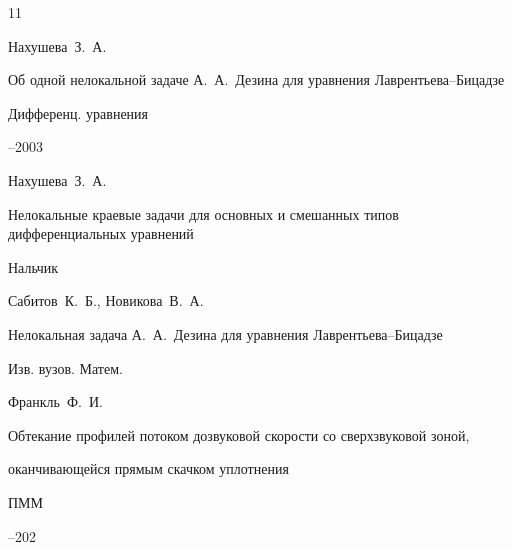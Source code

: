\begin{thebibliography}{11}

\by Нахушева~З.~А.

\paper Об одной нелокальной задаче А.~А.~Дезина для уравнения Лаврентьева--Бицадзе

\jour Дифференц. уравнения




--2003









\by Нахушева~З.~А.

\paper Нелокальные краевые задачи для основных и смешанных типов дифференциальных уравнений

\publaddr Нальчик






\by Сабитов~К.~Б., Новикова~В.~А.

\paper Нелокальная задача А.~А.~Дезина для уравнения Лаврентьева--Бицадзе

\jour Изв. вузов. Матем.



\toappear







\by Франкль~Ф.~И.

\paper Обтекание профилей потоком дозвуковой скорости со сверхзвуковой зоной,

оканчивающейся прямым скачком уплотнения

\jour ПММ




--202








\end{thebibliography}
